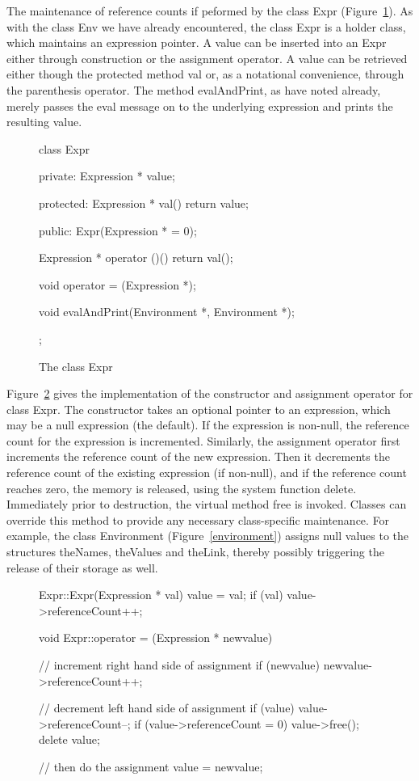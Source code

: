 The maintenance of reference counts if peformed by the class 
{\sf Expr} (Figure~\ref{expr}).
As with the class {\sf Env} we have already encountered, the class {\sf Expr}
is a holder class, which maintains an expression pointer.
A value can be inserted into an {\sf Expr} either through construction or
the assignment operator.  A value can be retrieved either though the
protected method {\sf val} or, as a notational convenience, through the 
parenthesis
operator.  The method {\sf evalAndPrint}, as have noted already, merely 
passes the {\sf eval} message on to the underlying expression and
prints the resulting value.

\begin{figure}
\begin{cprog}
class Expr {
private:
	Expression * value;

protected:
	Expression * val()
		{ return value; }

public:
	Expr(Expression * = 0);

	Expression * operator ()()
		{ return val(); }

	void operator = (Expression *);

	void evalAndPrint(Environment *, Environment *);
};
\end{cprog}
\caption{The class {\sf Expr}}\label{expr}
\end{figure}

Figure~\ref{assign} gives the implementation of the constructor and
assignment operator for class {\sf Expr}.  The constructor takes an
optional pointer to an expression, which may be a null expression (the
default).  If the expression is
non-null, the reference count for the expression is incremented.
Similarly, the assignment operator first increments the reference count of
the new expression.  Then it decrements the reference count of the existing
expression (if non-null), and if the reference count reaches zero,
the memory is released, using the system function {\sf delete}.
Immediately prior to destruction, the virtual method {\sf free} is invoked.
Classes can override this method to provide any necessary class-specific 
maintenance.  For example, the class {\sf Environment} (Figure~\ref{environment})
assigns null values to the structures {\sf theNames}, {\sf theValues} and
{\sf theLink}, thereby possibly triggering the release of their storage as
well.

\begin{figure}
\begin{cprog}
Expr::Expr(Expression * val)
{
	value = val;
	if (val) value->referenceCount++;
}

void Expr::operator = (Expression * newvalue)
{
	// increment right hand side of assignment
	if (newvalue) {
		newvalue->referenceCount++;
		}

	// decrement left hand side of assignment 
	if (value) {
		value->referenceCount--;
		if (value->referenceCount = 0) {
			value->free();
			delete value;
			}
		}

	// then do the assignment
	value = newvalue;
}
\end{cprog}
\label{Assignment and Initialization of Expressions}\label{assign}
\end{figure}


